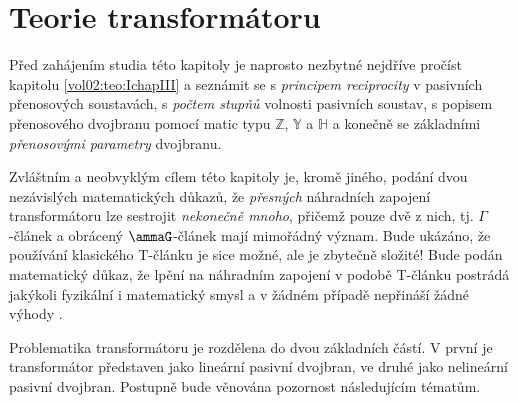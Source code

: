 \setchaptertoc
\chapter{Teorie transformátoru}\label{ES:kap_teorie_trafa}
  Před zahájením studia této kapitoly je naprosto nezbytné nejdříve pročíst kapitolu 
  \ref{vol02:teo:IchapIII} a seznámit se s \emph{principem reciprocity} v pasivních přenosových 
  soustavách, s \emph{počtem stupňů} volnosti pasivních soustav, s popisem přenosového dvojbranu 
  pomocí matic typu \(\mathbb{Z}\), \(\mathbb{Y}\) a \(\mathbb{H}\) a konečně se základními 
  \emph{přenosovými parametry} dvojbranu.
  
  Zvláštním a neobvyklým cílem této kapitoly je, kromě jiného, podání dvou nezávislých 
  matematických důkazů, že \emph{přesných} náhradních zapojení transformátoru lze sestrojit 
  \emph{nekonečně mnoho}, přičemž pouze dvě z nich, tj. \(\Gamma\)-článek a obrácený 
  \(\ammaG\)-článek mají mimořádný význam. Bude ukázáno, že používání klasického T-článku je sice 
  možné, ale je zbytečně složité! Bude podán matematický důkaz, že lpění na náhradním zapojení v 
  podobě T-článku postrádá jakýkoli fyzikální i matematický smysl a v žádném případě nepřináší 
  žádné výhody \cite[s.~340]{Patocka4}. 

  Problematika transformátoru je rozdělena do dvou základních částí. V první je transformátor  
  představen jako lineární pasivní dvojbran, ve druhé jako nelineární pasivní dvojbran. Postupně  
  bude věnována pozornost následujícím tématům.

